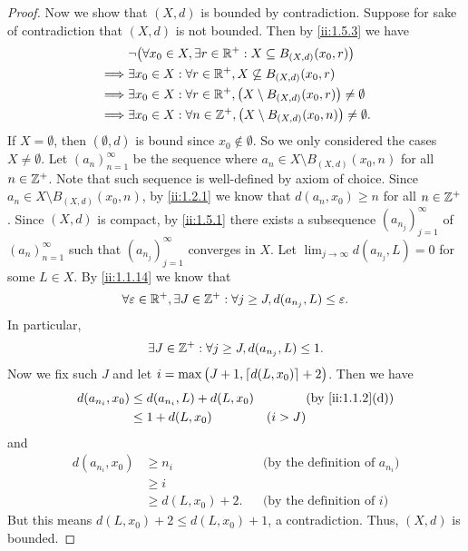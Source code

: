 \begin{proof}
  Now we show that \((X, d)\) is bounded by contradiction.
  Suppose for sake of contradiction that \((X, d)\) is not bounded.
  Then by \cref{ii:1.5.3} we have
  \begin{align*}
             & \lnot\big(\forall x_0 \in X, \exists r \in \mathbb{R}^+ : X \subseteq B_{(X, d)}(x_0, r)\big)            \\
    \implies & \exists x_0 \in X : \forall r \in \mathbb{R}^+, X \not\subseteq B_{(X, d)}(x_0, r)                       \\
    \implies & \exists x_0 \in X : \forall r \in \mathbb{R}^+, \big(X \setminus B_{(X, d)}(x_0, r)\big) \neq \emptyset  \\
    \implies & \exists x_0 \in X : \forall n \in \mathbb{Z}^+, \big(X \setminus B_{(X, d)}(x_0, n)\big) \neq \emptyset.
  \end{align*}
  If \(X = \emptyset\), then \((\emptyset, d)\) is bound since \(x_0 \notin \emptyset\).
  So we only considered the cases \(X \neq \emptyset\).
  Let \((a_n)_{n = 1}^\infty\) be the sequence where \(a_n \in X \setminus B_{(X, d)}(x_0, n)\) for all \(n \in \mathbb{Z}^+\).
  Note that such sequence is well-defined by axiom of choice.
  Since \(a_n \in X \setminus B_{(X, d)}(x_0, n)\), by \cref{ii:1.2.1} we know that \(d(a_n, x_0) \geq n\) for all \(n \in \mathbb{Z}^+\).
  Since \((X, d)\) is compact, by \cref{ii:1.5.1} there exists a subsequence \((a_{n_j})_{j = 1}^\infty\) of \((a_n)_{n = 1}^\infty\) such that \((a_{n_j})_{j = 1}^\infty\) converges in \(X\).
  Let \(\lim_{j \to \infty} d(a_{n_j}, L) = 0\) for some \(L \in X\).
  By \cref{ii:1.1.14} we know that
  \[
    \forall \varepsilon \in \mathbb{R}^+, \exists J \in \mathbb{Z}^+ : \forall j \geq J, d(a_{n_j}, L) \leq \varepsilon.
  \]
  In particular,
  \[
    \exists J \in \mathbb{Z}^+ : \forall j \geq J, d(a_{n_j}, L) \leq 1.
  \]
  Now we fix such \(J\) and let \(i = \max\big(J + 1, \left\lceil d(L, x_0)\right\rceil + 2\big)\).
  Then we have
  \begin{align*}
    d(a_{n_i}, x_0) & \leq d(a_{n_i}, L) + d(L, x_0) &         & \by{ii:1.1.2}[d] \\
                    & \leq 1 + d(L, x_0)             & (i > J)
  \end{align*}
  and
  \begin{align*}
    d(a_{n_i}, x_0) & \geq n_i            &  & \text{(by the definition of \(a_{n_i}\))} \\
                    & \geq i                                                             \\
                    & \geq d(L, x_0) + 2. &  & \text{(by the definition of \(i\))}
  \end{align*}
  But this means \(d(L, x_0) + 2 \leq d(L, x_0) + 1\), a contradiction.
  Thus, \((X, d)\) is bounded.
\end{proof}

